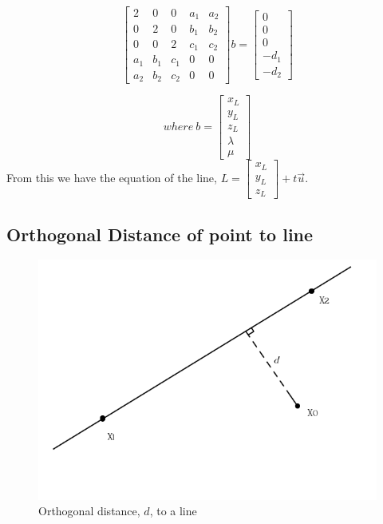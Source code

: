 	\[
	\begin{bmatrix}
	2 & 0 & 0 & a_1 & a_2 \\
	0 & 2 & 0 & b_1 & b_2 \\
	0 & 0 & 2 & c_1 & c_2 \\
	a_1 & b_1 & c_1 & 0 & 0 \\
	a_2 & b_2 & c_2 & 0 & 0
	\end{bmatrix}
	b=
	\begin{bmatrix}
	0 \\
	0\\
	0 \\
	-d_1 \\
	-d_2 
	\end{bmatrix}
	\]
	
	\[
	where\: b = 	\begin{bmatrix}
		x_L \\
		y_L\\
		z_L \\
		\lambda \\
		\mu 
	\end{bmatrix}
	\]
	\newline
	\newline
	From this we have the equation of the line, $L = \begin{bmatrix}
	x_L \\
	y_L\\
	z_L 
	\end{bmatrix} + t\vec{u}$.
	
	\subsection{Orthogonal Distance of point to line}
	\begin{figure}[H]
		\centering
		\includegraphics[width=0.7\linewidth]{"Includes/images/OrthogDist to line"}
		\caption{Orthogonal distance, $d$, to a  line}
		\label{fig:OrthogDisttoline}
	\end{figure}
	
